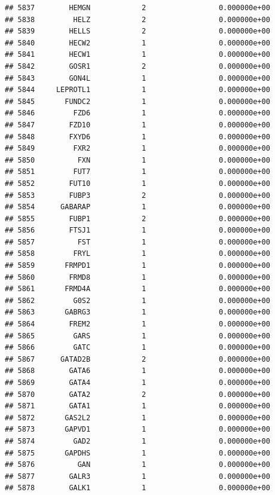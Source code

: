 \documentclass[
]{article}
\begin{document}
\begin{verbatim}
## 5837        HEMGN            2                 0.000000e+00
## 5838         HELZ            2                 0.000000e+00
## 5839        HELLS            2                 0.000000e+00
## 5840        HECW2            1                 0.000000e+00
## 5841        HECW1            1                 0.000000e+00
## 5842        GOSR1            2                 0.000000e+00
## 5843        GON4L            1                 0.000000e+00
## 5844     LEPROTL1            1                 0.000000e+00
## 5845       FUNDC2            1                 0.000000e+00
## 5846         FZD6            1                 0.000000e+00
## 5847        FZD10            1                 0.000000e+00
## 5848        FXYD6            1                 0.000000e+00
## 5849         FXR2            1                 0.000000e+00
## 5850          FXN            1                 0.000000e+00
## 5851         FUT7            1                 0.000000e+00
## 5852        FUT10            1                 0.000000e+00
## 5853        FUBP3            2                 0.000000e+00
## 5854      GABARAP            1                 0.000000e+00
## 5855        FUBP1            2                 0.000000e+00
## 5856        FTSJ1            1                 0.000000e+00
## 5857          FST            1                 0.000000e+00
## 5858         FRYL            1                 0.000000e+00
## 5859       FRMPD1            1                 0.000000e+00
## 5860        FRMD8            1                 0.000000e+00
## 5861       FRMD4A            1                 0.000000e+00
## 5862         G0S2            1                 0.000000e+00
## 5863       GABRG3            1                 0.000000e+00
## 5864        FREM2            1                 0.000000e+00
## 5865         GARS            1                 0.000000e+00
## 5866         GATC            1                 0.000000e+00
## 5867      GATAD2B            2                 0.000000e+00
## 5868        GATA6            1                 0.000000e+00
## 5869        GATA4            1                 0.000000e+00
## 5870        GATA2            2                 0.000000e+00
## 5871        GATA1            1                 0.000000e+00
## 5872       GAS2L2            1                 0.000000e+00
## 5873       GAPVD1            1                 0.000000e+00
## 5874         GAD2            1                 0.000000e+00
## 5875       GAPDHS            1                 0.000000e+00
## 5876          GAN            1                 0.000000e+00
## 5877        GALR3            1                 0.000000e+00
## 5878        GALK1            1                 0.000000e+00

\end{verbatim}
\end{document}
